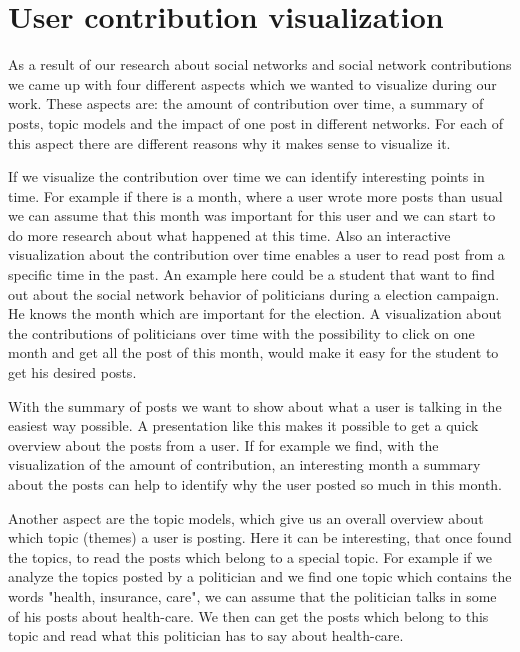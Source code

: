 \section{User contribution visualization}\label{sec:uservisualization} 

As a result of our research about social networks and social network contributions we came up with four different aspects which we wanted to visualize during our work. These aspects are: the amount of contribution over time, a summary of posts, topic models and the impact of one post in different networks. For each of this aspect there are different reasons why it makes sense to visualize it. 


If we visualize the contribution over time we can identify interesting points in time. For example if there is a month, where a user wrote more posts than usual we can assume that this month was important for this user and we can start to do more research about what happened at this time. Also an interactive visualization about the contribution over time enables a user to read post from a specific time in the past. An example here could be  a student that want to find out about the social network behavior of politicians during a election campaign. He knows the month which are important for the election. A visualization about the contributions of politicians over time with the possibility to click on one month and get all the post of this month, would make it easy for the student to get his desired posts. 


With the summary of posts we want to show about what a user is talking in the easiest way possible. A presentation like this makes it possible  to get a quick overview about the posts from a user. If for example we find, with the visualization of the amount of contribution, an interesting month  a summary about the posts can help to identify why the user posted so much in this month.


Another aspect are the topic models, which give us an overall overview about which topic (themes) a user is posting. Here it can be interesting, that once found the topics, to read the posts which belong to a special topic. For example if we analyze the topics posted by a politician and we find one topic which contains the words "health, insurance, care", we can assume that the politician talks  in some of his posts about health-care. We then can get the posts which belong to  this topic and read what this politician has to say about  health-care. 


